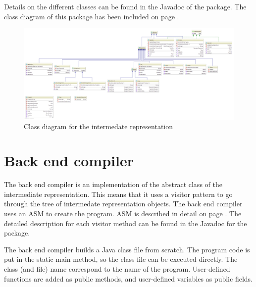 Details on the different classes can be found in the Javadoc of the  package. The class diagram of this package has been included on page \pageref{fig:class_diagram__intermediate}.

\begin{figure}[p]
\centering
\includegraphics{Images/class_diagram__intermediate}
\caption{Class diagram for the intermedate representation}
\label{fig:class_diagram__intermediate}
\end{figure}

\section{Back end compiler}

The back end compiler is an implementation of the  abstract class of the intermediate representation.
This means that it uses a visitor pattern to go through the tree of intermedate representation objects.
The back end compiler uses an ASM  to create the program.
ASM is described in detail on page \pageref{subj:asm}.
The detailed description for each visitor method can be found in the Javadoc for the  package.

The back end compiler builds a Java class file from scratch.
The program code is put in the static main method, so the class file can be executed directly.
The class (and file) name correspond to the name of the program.
User-defined functions are added as public methods, and user-defined variables as public fields.
